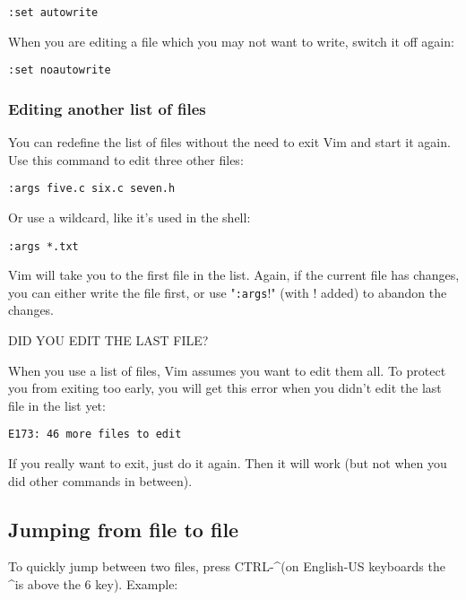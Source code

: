  \begin{Verbatim}[samepage=true]
 :set autowrite
 \end{Verbatim}

When you are editing a file which you may not want to write, switch it off again:

 \begin{Verbatim}[samepage=true]
 :set noautowrite
 \end{Verbatim}

\subsubsection{Editing another list of files}
You can redefine the list of files without the need to exit Vim and start it again.
Use this command to edit three other files:

 \begin{Verbatim}[samepage=true]
 :args five.c six.c seven.h
 \end{Verbatim}

Or use a wildcard, like it's used in the shell:

 \begin{Verbatim}[samepage=true]
 :args *.txt
 \end{Verbatim}

Vim will take you to the first file in the list.
Again, if the current file has changes, you can either write the file first, or use "\verb!:args!!" (with !  added) to abandon the changes.

DID YOU EDIT THE LAST FILE?
\label{arglist-quit}

When you use a list of files, Vim assumes you want to edit them all.
To protect you from exiting too early, you will get this error when you didn't edit the last file in the list yet:

		\begin{Verbatim}[samepage=true]
    E173: 46 more files to edit 
						\end{Verbatim}

If you really want to exit, just do it again.
Then it will work (but not when you did other commands in between).

\subsection{Jumping from file to file}
To quickly jump between two files, press CTRL-\textasciicircum (on English-US keyboards the \textasciicircum is above the 6 key).
Example:

